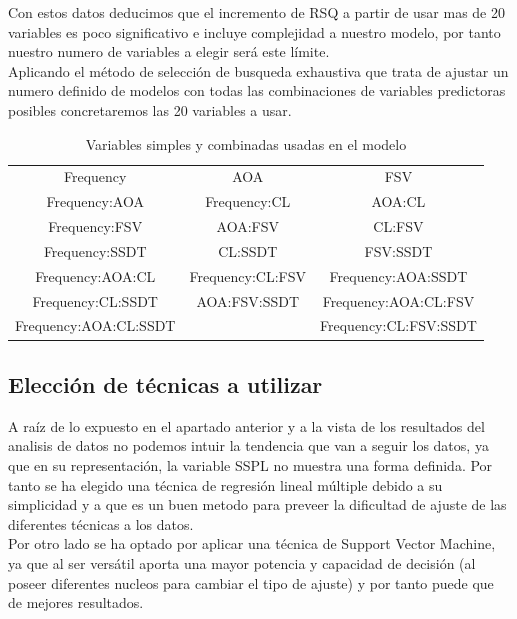Con estos datos deducimos que el incremento de RSQ a partir de usar mas de 20 variables es poco significativo e incluye complejidad a nuestro modelo, por tanto nuestro numero de variables a elegir será este límite.\\

Aplicando el método de selección de busqueda exhaustiva que trata de ajustar un numero definido de modelos con todas las combinaciones de variables predictoras posibles concretaremos las 20 variables a usar.

\begin{table}[h]
\centering

\label{combinaciones}
\begin{tabular}{ccc}
Frequency             & AOA              & FSV                                       \\
Frequency:AOA         & Frequency:CL     & AOA:CL                                    \\
Frequency:FSV         & AOA:FSV          & CL:FSV                                    \\
Frequency:SSDT        & CL:SSDT          & FSV:SSDT                                  \\
Frequency:AOA:CL      & Frequency:CL:FSV & Frequency:AOA:SSDT                        \\
Frequency:CL:SSDT     & AOA:FSV:SSDT     & Frequency:AOA:CL:FSV                      \\
Frequency:AOA:CL:SSDT &                  & \multicolumn{1}{l}{Frequency:CL:FSV:SSDT}
\end{tabular}
\caption{Variables simples y combinadas usadas en el modelo}
\end{table}

\subsection{Elección de técnicas a utilizar}

A raíz de lo expuesto en el apartado anterior y a la vista de los resultados del analisis de datos no podemos intuir la tendencia que van a seguir los datos, ya que en su representación, la variable SSPL no muestra una forma definida. Por tanto se ha elegido una técnica de regresión lineal múltiple debido a su simplicidad y a que es un buen metodo para preveer la dificultad de ajuste de las diferentes técnicas a los datos.\\

Por otro lado se ha optado por aplicar una técnica de Support Vector Machine, ya que al ser versátil aporta una mayor potencia y capacidad de decisión (al poseer diferentes nucleos para cambiar el tipo de ajuste) y por tanto puede que  de mejores resultados.

